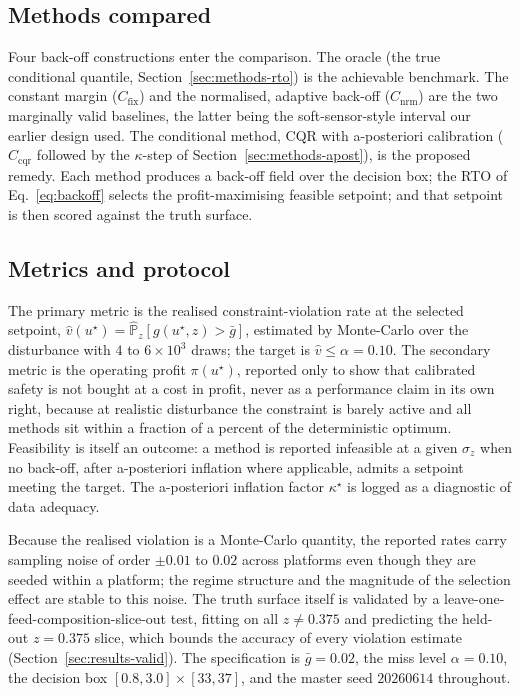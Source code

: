 \subsection{Methods compared}

Four back-off constructions enter the comparison. The oracle (the true conditional quantile,
Section~\ref{sec:methods-rto}) is the achievable benchmark. The constant margin
($C_{\mathrm{fix}}$) and the normalised, adaptive back-off ($C_{\mathrm{nrm}}$) are the two
marginally valid baselines, the latter being the soft-sensor-style interval our earlier
design used. The conditional method, CQR with a-posteriori calibration ($C_{\mathrm{cqr}}$
followed by the $\kappa$-step of Section~\ref{sec:methods-apost}), is the proposed remedy.
Each method produces a back-off field over the decision box; the RTO of
Eq.~\eqref{eq:backoff} selects the profit-maximising feasible setpoint; and that setpoint is
then scored against the truth surface.

\subsection{Metrics and protocol}

The primary metric is the realised constraint-violation rate at the selected setpoint, $\hat
v(u^\star)=\widehat{\mathbb P}_z[g(u^\star,z)>\bar g]$, estimated by Monte-Carlo over the
disturbance with $4$ to $6\times10^{3}$ draws; the target is $\hat v\le\alpha=0.10$. The
secondary metric is the operating profit $\pi(u^\star)$, reported only to show that calibrated
safety is not bought at a cost in profit, never as a performance claim in its own right,
because at realistic disturbance the constraint is barely active and all methods sit within a
fraction of a percent of the deterministic optimum. Feasibility is itself an outcome: a method
is reported infeasible at a given $\sigma_z$ when no back-off, after a-posteriori inflation
where applicable, admits a setpoint meeting the target. The a-posteriori inflation factor
$\kappa^\star$ is logged as a diagnostic of data adequacy.

Because the realised violation is a Monte-Carlo quantity, the reported rates carry sampling
noise of order $\pm0.01$ to $0.02$ across platforms even though they are seeded within a
platform; the regime structure and the magnitude of the selection effect are stable to this
noise. The truth surface itself is validated by a leave-one-feed-composition-slice-out test,
fitting on all $z\neq0.375$ and predicting the held-out $z=0.375$ slice, which bounds the
accuracy of every violation estimate (Section~\ref{sec:results-valid}). The specification is
$\bar g=0.02$, the miss level $\alpha=0.10$, the decision box $[0.8,3.0]\times[33,37]$, and the
master seed $20260614$ throughout.
